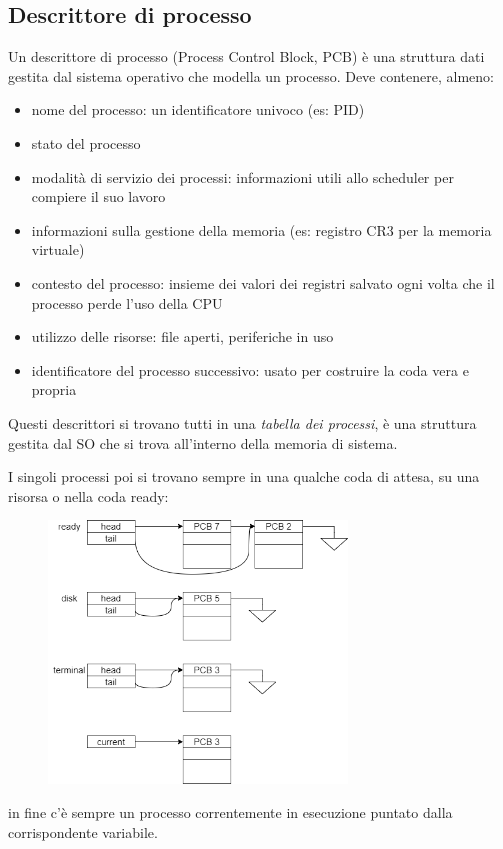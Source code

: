 \subsection{Descrittore di processo}
Un descrittore di processo (Process Control Block, PCB) è una struttura dati gestita dal sistema operativo che modella un processo. Deve contenere, almeno:
\begin{itemize}
    \item nome del processo: un identificatore univoco (es: PID)
    \item stato del processo
    \item modalità di servizio dei processi: informazioni utili allo scheduler per compiere il suo lavoro
    \item informazioni sulla gestione della memoria (es: registro CR3 per la memoria virtuale)
    \item contesto del processo: insieme dei valori dei registri salvato ogni volta che il processo perde l'uso della CPU
    \item utilizzo delle risorse: file aperti, periferiche in uso
    \item identificatore del processo successivo: usato per costruire la coda vera e propria
\end{itemize}

Questi descrittori si trovano tutti in una \emph{tabella dei processi}, è una struttura gestita dal SO che si trova all'interno della memoria di sistema.

I singoli processi poi si trovano sempre in una qualche coda di attesa, su una risorsa o nella coda ready:
\begin{figure}[H]
    \centering
    \includegraphics[width=300px]{images/3_Gestione_dei_processi/code_PCB.png}
\end{figure}
in fine c'è sempre un processo correntemente in esecuzione puntato dalla corrispondente variabile.

